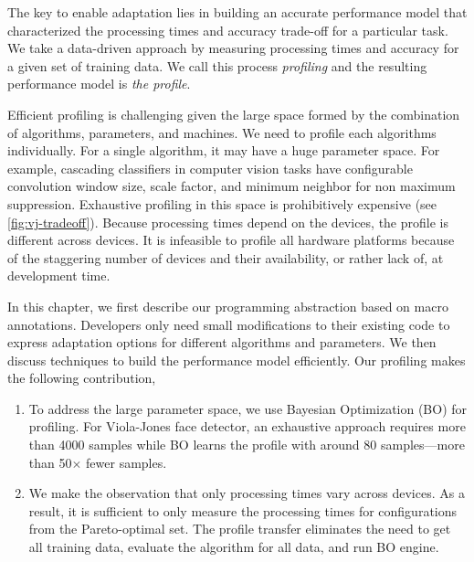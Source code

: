 The key to enable adaptation lies in building an accurate performance model that
characterized the processing times and accuracy trade-off for a particular
task. We take a data-driven approach by measuring processing times and accuracy
for a given set of training data. We call this process \emph{profiling} and the
resulting performance model is \emph{the profile}.

Efficient profiling is challenging given the large space formed by the
combination of algorithms, parameters, and machines. We need to profile each
algorithms individually. For a single algorithm, it may have a huge parameter
space. For example, cascading classifiers in computer vision tasks have
configurable convolution window size, scale factor, and minimum neighbor for non
maximum suppression. Exhaustive profiling in this space is prohibitively
expensive (see \autoref{fig:vj-tradeoff}). Because processing times depend on
the devices, the profile is different across devices. It is infeasible to
profile all hardware platforms because of the staggering number of devices and
their availability, or rather lack of, at development time.

In this chapter, we first describe our programming abstraction based on macro
annotations. Developers only need small modifications to their existing code to
express adaptation options for different algorithms and parameters. We then
discuss techniques to build the performance model efficiently. Our profiling
makes the following contribution,

\begin{enumerate}[noitemsep, topsep=0pt]
\item To address the large parameter space, we use Bayesian Optimization (BO)
  for profiling. For Viola-Jones face detector, an exhaustive approach requires
  more than 4000 samples while BO learns the profile with around 80
  samples---more than 50$\times$ fewer samples.
\item We make the observation that only processing times vary across devices. As
  a result, it is sufficient to only measure the processing times for
  configurations from the Pareto-optimal set. The profile transfer eliminates
  the need to get all training data, evaluate the algorithm for all data, and
  run BO engine.
\end{enumerate}

